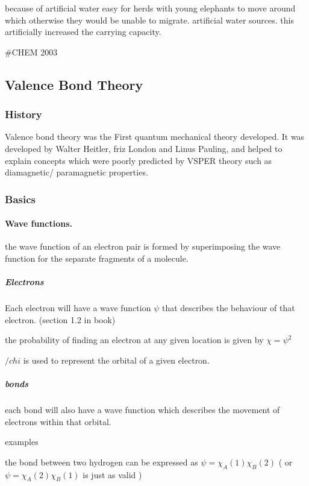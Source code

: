 \documentclass[]{article}
\let\oldparagraph\paragraph
\renewcommand{\paragraph}[1]{\oldparagraph{#1}\mbox{}}
\let\oldsubparagraph\subparagraph
\renewcommand{\subparagraph}[1]{\oldsubparagraph{#1}\mbox{}}
\begin{document}
because of artificial water easy for herds with young elephants to move
around which otherwise they would be unable to migrate. artificial water
sources. this artificially increased the carrying capacity.

\#CHEM 2003

\hypertarget{valence-bond-theory}{%
\subsection{Valence Bond Theory}\label{valence-bond-theory}}

\hypertarget{history}{%
\subsubsection{History}\label{history}}

Valence bond theory was the First quantum mechanical theory developed.
It was developed by Walter Heitler, friz London and Linus Pauling, and
helped to explain concepts which were poorly predicted by VSPER theory
such as diamagnetic/ paramagnetic properties.

\hypertarget{basics-1}{%
\subsubsection{Basics}\label{basics-1}}

\hypertarget{wave-functions.}{%
\paragraph{Wave functions.}\label{wave-functions.}}

the wave function of an electron pair is formed by superimposing the
wave function for the separate fragments of a molecule.

\hypertarget{electrons}{%
\subparagraph{Electrons}\label{electrons}}

Each electron will have a wave function \(\psi\) that describes the
behaviour of that electron. (section 1.2 in book)

the probability of finding an electron at any given location is given by
\(\chi= \psi^{2}\)

\(/chi\) is used to represent the orbital of a given electron.

\hypertarget{bonds}{%
\subparagraph{bonds}\label{bonds}}

each bond will also have a wave function which describes the movement of
electrons within that orbital.

examples

the bond between two hydrogen can be expressed as
\(\psi= \chi_{A}(1)\chi_{B}(2)\) ( or \(\psi=\chi_{A}(2)\chi_{B}(1)\) is
just as valid )
\end{document}

